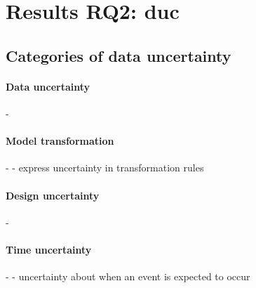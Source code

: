 \section[Results RQ2: data uncertainty]{Results RQ2: \gls{duc}}
\label{sec:sota:results:duc}


\subsection{Categories of data uncertainty}

\paragraph{Data uncertainty}
- \cite{DBLP:conf/models/BurguenoBMV18, baudin2017openturns, DBLP:journals/corr/BorgstromGGMG13, DBLP:conf/ecmdafa/BertoaMBBTV18, DBLP:conf/asplos/BornholtMM14, osti_1430202, DBLP:conf/sle/MayerhoferWV16, DBLP:journals/peerj-cs/SalvatierWF16, DBLP:conf/quatic/VallecilloMO16, DBLP:journals/sosym/Zhang00NO19, DBLP:journals/csi/Hall06, DBLP:journals/infsof/Jimenez-RamirezW0V15, DBLP:conf/ecmdafa/ZhangSAYON16, DBLP:journals/tkde/BarbaraGP92, DBLP:conf/vldb/BenjellounSHW06, DBLP:conf/popl/BhatAVG12, DBLP:conf/aistats/ChagantyNR13, DBLP:journals/siamsc/JaroszewiczK12, DBLP:journals/toplas/ParkPT08, DBLP:conf/ijcai/Pfeffer01, DBLP:conf/popl/RamseyP02, DBLP:conf/pldi/SankaranarayananCG13, DBLP:conf/uist/SchwarzMH11, DBLP:conf/icra/Thrun00, DBLP:journals/sac/LunnTBS00, plummer2003jags}

\paragraph{Model transformation}
- \cite{DBLP:conf/models/BurguenoBMV18, DBLP:conf/sle/EramoPR15, DBLP:conf/icse/EramoPR14}
	- express uncertainty in transformation rules
	
\paragraph{Design uncertainty}
- \cite{DBLP:conf/icse/FamelisSC12, DBLP:journals/sosym/FamelisC19, DBLP:conf/sle/EramoPR15, DBLP:conf/icse/EramoPR14, DBLP:journals/re/SalayCHS13, DBLP:conf/ecmdafa/ZhangSAYON16}

\paragraph{Time uncertainty}
- \cite{DBLP:conf/icst/Garousi08}
	- uncertainty about when an event is expected to occur
	
